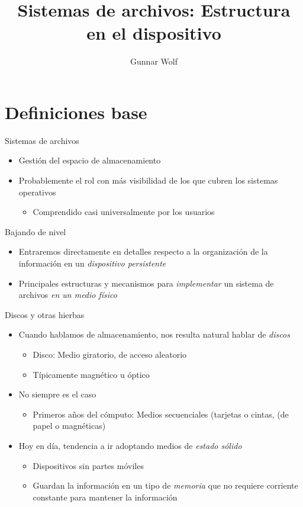 \documentclass[presentation]{beamer}
\author{Gunnar Wolf}
\date{}
\title{Sistemas de archivos: Estructura en el dispositivo}
\begin{document}
\maketitle

\section{Definiciones base}
\label{sec:org5085b45}

\begin{frame}[label={sec:orgc578195}]{Sistemas de archivos}
\begin{itemize}
\item Gestión del espacio de almacenamiento
\item Probablemente el rol con más visibilidad de los que cubren los
sistemas operativos
\begin{itemize}
\item Comprendido casi universalmente por los usuarios
\end{itemize}
\end{itemize}
\end{frame}

\begin{frame}[label={sec:org709b448}]{Bajando de nivel}
\begin{itemize}
\item Entraremos directamente en detalles respecto a la organización de la
información en un \emph{dispositivo persistente}
\item Principales estructuras y mecanismos para \emph{implementar} un sistema
de archivos \emph{en un medio físico}
\end{itemize}
\end{frame}

\begin{frame}[label={sec:orgee1eace}]{Discos y otras hierbas}
\begin{itemize}
\item Cuando hablamos de almacenamiento, nos resulta natural hablar de \emph{discos}
\begin{itemize}
\item Disco: Medio giratorio, de acceso aleatorio
\item Típicamente magnético u óptico
\end{itemize}
\item No siempre es el caso
\begin{itemize}
\item Primeros años del cómputo: Medios secuenciales (tarjetas o cintas,
(de papel o magnéticas)
\end{itemize}
\item Hoy en día, tendencia a ir adoptando medios de \emph{estado sólido}
\begin{itemize}
\item Dispositivos sin partes móviles
\item Guardan la información en un tipo de \emph{memoria} que no requiere
corriente constante para mantener la información
\end{itemize}
\end{itemize}
\end{frame}
\end{document}
